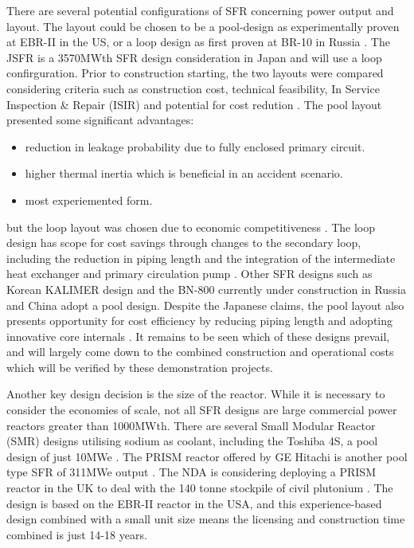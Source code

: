 \documentclass[journal]{IEEEtran}
\begin{document}
There are several potential configurations of SFR concerning power output and layout. 
The layout could be chosen to be a pool-design as experimentally proven at EBR-II in the US, or a loop design as first proven at BR-10 in Russia \cite{Int2012}. 
The JSFR is a 3570MWth SFR design consideration in Japan and will use a loop confirguration. 
Prior to construction starting, the two layouts were compared considering criteria such as construction cost, technical feasibility, In Service Inspection \& Repair (ISIR) and potential for cost redution \cite{Sakamoto2013194}.
The pool layout presented some significant advantages:
\begin{itemize}
\item reduction in leakage probability due to fully enclosed primary circuit.
\item higher thermal inertia which is beneficial in an accident scenario.
\item most experiemented form.
\end{itemize}
but the loop layout was chosen due to economic competitiveness \cite{Locatelli2013}. 
The loop design has scope for cost savings through changes to the secondary loop, including the reduction in piping length and the integration of the intermediate heat exchanger and primary circulation pump \cite{Sakamoto2013194}. 
Other SFR designs such as Korean KALIMER design and the BN-800 currently under construction in Russia and China adopt a pool design. Despite the Japanese claims, the pool layout also presents opportunity for cost efficiency by reducing piping length and adopting innovative core internals \cite{Locatelli2013}. It remains to be seen which of these designs prevail, and will largely come down to the combined construction and operational costs which will be verified by these demonstration projects.

Another key design decision is the size of the reactor. 
While it is necessary to consider the economies of scale, not all SFR designs are large commercial power reactors greater than 1000MWth.
There are several Small Modular Reactor (SMR) designs utilising sodium as coolant, including the Toshiba 4S, a pool design of just 10MWe \cite{Locatelli2013}. 
The PRISM reactor offered by GE Hitachi is another pool type SFR of 311MWe output \cite{Locatelli2013}. 
The NDA is considering deploying a PRISM reactor in the UK to deal with the 140 tonne stockpile of civil plutonium \cite{NDA14}. 
The design is based on the EBR-II reactor in the USA, and this experience-based design combined with a small unit size means the licensing and construction time combined is just 14-18 years\cite{NDA14}.
\end{document}
